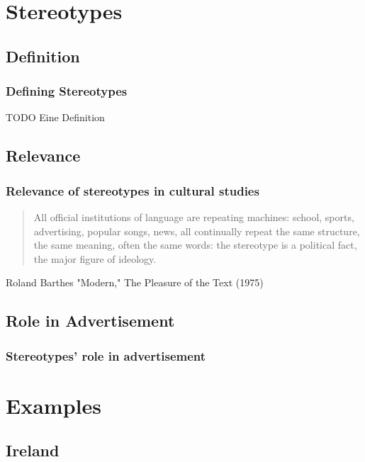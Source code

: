 \documentclass{beamer}
\begin{document}
\section{Stereotypes}

\subsection{Definition}

\begin{frame}
 \frametitle{Defining Stereotypes}
  \begin{Definition}
    TODO Eine Definition
  \end{Definition}
\end{frame}

\subsection{Relevance}

\begin{frame}
 \frametitle{Relevance of stereotypes in cultural studies}
 \begin{quotation} %
   All official institutions of language are repeating machines: school, sports, advertising, popular songs, news, all continually repeat the same structure, the same meaning, often the same words: the stereotype is a political fact, the major figure of ideology.\\
 \end{quotation}
 Roland Barthes "Modern," The Pleasure of the Text (1975)
\end{frame}

\subsection{Role in Advertisement}

\begin{frame}
 \frametitle{Stereotypes' role in advertisement}
\end{frame}

\section{Examples}
\subsection{Ireland}
\end{document}
